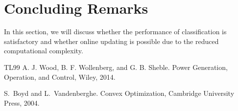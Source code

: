 \documentclass[11pt]{article}
\begin{document}
\section{Concluding Remarks}\label{sec:conclusions}
In this section, we will discuss whether the performance of classification is satisfactory and whether online updating is possible due to the reduced computational complexity.

\begin{thebibliography} {TL99}
 {\sc A. J. Wood, B. F. Wollenberg, and G. B. Sheble.} Power Generation, Operation, and Control, Wiley, 2014.

 {\sc S.\ Boyd and L.\ Vandenberghe.} Convex Optimization,
Cambridge University Press, 2004.
\end{thebibliography}
\end{document}
